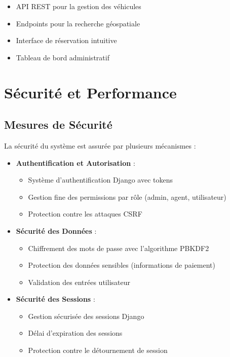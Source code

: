 \begin{itemize}
    \item API REST pour la gestion des véhicules
    \item Endpoints pour la recherche géospatiale
    \item Interface de réservation intuitive
    \item Tableau de bord administratif
\end{itemize}

\section{Sécurité et Performance}

\subsection{Mesures de Sécurité}
La sécurité du système est assurée par plusieurs mécanismes :

\begin{itemize}
    \item \textbf{Authentification et Autorisation} :
    \begin{itemize}
        \item Système d'authentification Django avec tokens
        \item Gestion fine des permissions par rôle (admin, agent, utilisateur)
        \item Protection contre les attaques CSRF
    \end{itemize}
    
    \item \textbf{Sécurité des Données} :
    \begin{itemize}
        \item Chiffrement des mots de passe avec l'algorithme PBKDF2
        \item Protection des données sensibles (informations de paiement)
        \item Validation des entrées utilisateur
    \end{itemize}
    
    \item \textbf{Sécurité des Sessions} :
    \begin{itemize}
        \item Gestion sécurisée des sessions Django
        \item Délai d'expiration des sessions
        \item Protection contre le détournement de session
    \end{itemize}
\end{itemize}

